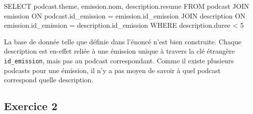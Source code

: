 \documentclass[
  letterpaper,
  DIV=11,
  numbers=noendperiod]{scrartcl}
\newenvironment{Shaded}{\begin{snugshade}}{\end{snugshade}}
\newcommand{\DecValTok}[1]{\textcolor[rgb]{0.68,0.00,0.00}{#1}}
\newcommand{\KeywordTok}[1]{\textcolor[rgb]{0.00,0.23,0.31}{#1}}
\newcommand{\NormalTok}[1]{\textcolor[rgb]{0.00,0.23,0.31}{#1}}
\newcommand{\OperatorTok}[1]{\textcolor[rgb]{0.37,0.37,0.37}{#1}}
\begin{document}
\begin{enumerate}
\begin{Shaded}
\begin{Highlighting}[]
\KeywordTok{SELECT}\NormalTok{ podcast.theme, emission.nom, description.}\KeywordTok{resume}
\KeywordTok{FROM}\NormalTok{ podcast}
\KeywordTok{JOIN}\NormalTok{ emission }\KeywordTok{ON}\NormalTok{ podcast.id\_emission }\OperatorTok{=}\NormalTok{ emission.id\_emission}
\KeywordTok{JOIN}\NormalTok{ description }\KeywordTok{ON}\NormalTok{ emission.id\_emission }\OperatorTok{=}\NormalTok{ description.id\_emission}
\KeywordTok{WHERE}\NormalTok{ description.duree }\OperatorTok{\textless{}} \DecValTok{5}
\end{Highlighting}
\end{Shaded}
\end{enumerate}

\begin{tcolorbox}[enhanced jigsaw, colframe=quarto-callout-important-color-frame, colback=white, bottomtitle=1mm, colbacktitle=quarto-callout-important-color!10!white, toprule=.15mm, rightrule=.15mm, title=\textcolor{quarto-callout-important-color}{\faExclamation}\hspace{0.5em}{Important}, breakable, titlerule=0mm, left=2mm, bottomrule=.15mm, arc=.35mm, toptitle=1mm, leftrule=.75mm, opacityback=0, opacitybacktitle=0.6, coltitle=black]

La base de donnée telle que définie dans l'énoncé n'est bien construite.
Chaque description est en-effet reliée à une émission unique à travers
la clé étrangère \texttt{id\_emission}, mais pas au podcast
correspondant. Comme il existe plusieurs podcasts pour une émission, il
n'y a pas moyen de savoir à quel podcast correspond quelle description.

\end{tcolorbox}

\hypertarget{exercice-2}{%
\subsection{Exercice 2}\label{exercice-2}}
\end{document}
